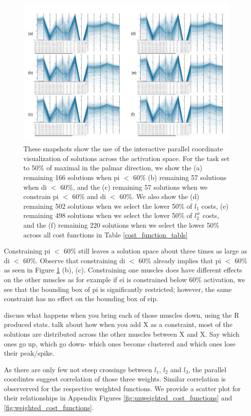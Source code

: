 \begin{figure}[htbp]
\centering
\includegraphics[width=\textwidth]{figs/parcoords.pdf}
\caption{These snapshots show the use of the interactive parallel coordinate visualization of solutions across the activation space. For the task set to 50\% of maximal in the palmar direction, we show the
(a) remaining 166 solutions when pi $<$ 60\% 
(b) remaining 57 solutions when di $<$ 60\%, and the
(c) remaining 57 solutions when we constrain pi $<$ 60\% and di $<$ 60\%. We also show the
(d) remaining 502 solutions when we select the lower 50\% of $l_1$ costs,
(e) remaining 498 solutions when we select the lower 50\% of $l_2^w$ costs, and the
(f) remaining 220 solutions when we select the lower 50\% across all cost functions in Table \ref{cost_function_tabls} }
\label{fig:parcoords}
\end{figure}

Constraining pi $<$ 60\% still leaves a solution space about three times as large as di $<$ 60\%. 
Observe that constraining di $<$ 60\% already implies that pi $<$ 60\% as seen in Figure \ref{fig:parcoords} (b), (c). 
Constraining one muscles does have different effects on the other muscles as for example if ei is constrained below 60\% activation, we see that the bounding box of pi is significantly restricted; however, the same constraint has no effect on the bounding box of eip.

discuss what happens when you bring each of those muscles down, using the R produced stats.
talk about how when you add X as a constraint, most of the solutions are distributed across the other muscles between X and X. Say which ones go up, which go down- which ones become clustered and which ones lose their peak/spike.

As there are only few not steep crossings between $l_1$, $l_2$ and $l_3$, the parallel coordintes suggest correlation of those three weights. Similar correlation is observerved for the respective weighted functions. %
We provide a scatter plot for their relationships in Appendix Figures \ref{fig:unweighted_cost_functions} and \ref{fig:weighted_cost_functions}.

